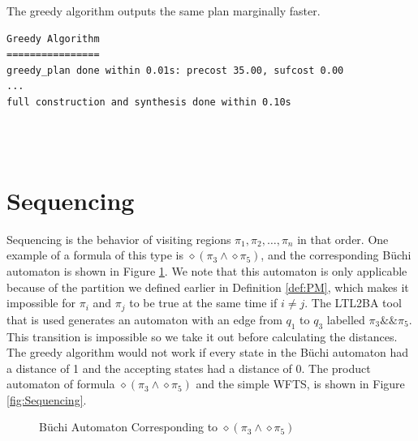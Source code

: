 The greedy algorithm outputs the same plan marginally faster. \\


\begin{minipage}{\textwidth}
\begingroup
\fontsize{9pt}{12pt}\selectfont
\begin{lstlisting}
Greedy Algorithm
================
greedy_plan done within 0.01s: precost 35.00, sufcost 0.00
...
full construction and synthesis done within 0.10s 
\end{lstlisting}
\endgroup
\end{minipage} \\ \\


\section{Sequencing}
Sequencing is the behavior of visiting regions $\pi_1,\pi_2,\dots,\pi_n$ in that order. One example of a formula of this type is $\diamond (\pi_3 \land  \diamond \pi_5)$, and the corresponding B\"uchi automaton is shown in Figure \ref{fig:seq}. We note that this automaton is only applicable because of the partition we defined earlier in Definition \ref{def:PM}, which makes it impossible for $\pi_i$ and $\pi_j$ to be true at the same time if $i\neq j$. The LTL2BA tool \cite{ltlbuchiwebsite} that is used generates an automaton with an edge from $q_1$ to $q_3$ labelled $\pi_3 \&\& \pi_5 $. This transition is impossible so we take it out before calculating the distances. The greedy algorithm would not work if every state in the B\"uchi automaton had a distance of 1 and the accepting states had a distance of 0. The product automaton of formula $\diamond (\pi_3 \wedge \diamond \pi_5)$ and the simple WFTS, is shown in Figure \ref{fig:Sequencing}.


\begin{figure}
\centering
{}
\caption{B\"uchi Automaton Corresponding to $  \diamond(\pi_3 \land \diamond \pi_5)$}
\label{fig:seq}
\end{figure}

